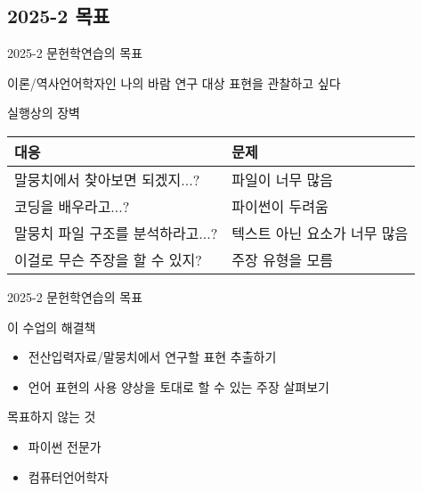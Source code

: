 \documentclass[11pt, aspectratio=169]{beamer}
\begin{document}
\subsection{2025-2 목표}

\begin{frame}{2025-2 문헌학연습의 목표}
  \begin{block}{이론/역사언어학자인 나의 바람}
    연구 대상 표현을 관찰하고 싶다
  \end{block}

  \begin{block}{실행상의 장벽}
    \begin{tabular}{ll}
      \textbf{대응} & \textbf{문제} \\
      \hline
      말뭉치에서 찾아보면 되겠지...? & 파일이 너무 많음 \\
      코딩을 배우라고...? & 파이썬이 두려움 \\
      말뭉치 파일 구조를 분석하라고...? & 텍스트 아닌 요소가 너무 많음 \\
      이걸로 무슨 주장을 할 수 있지? & 주장 유형을 모름 \\
    \end{tabular}
  \end{block}
\end{frame}

\begin{frame}[t]{2025-2 문헌학연습의 목표}
  \begin{block}{이 수업의 해결책}
    \begin{itemize}
      \item 전산입력자료/말뭉치에서 연구할 표현 추출하기
      \item 언어 표현의 사용 양상을 토대로 할 수 있는 주장 살펴보기
    \end{itemize}    
  \end{block}

  \begin{block}{목표하지 않는 것}
    \begin{itemize}
      \item 파이썬 전문가
      \item 컴퓨터언어학자
    \end{itemize}      
  \end{block}

\end{frame}
\end{document}
